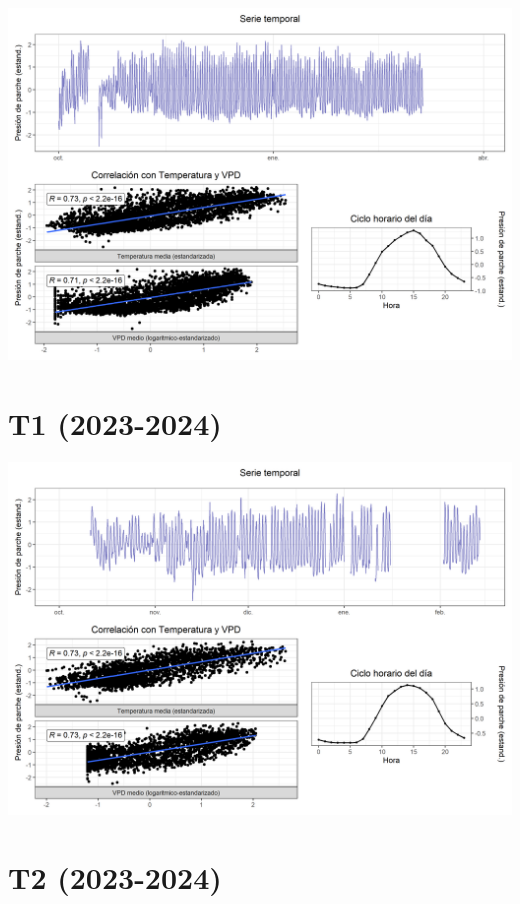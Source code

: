 \documentclass[
  letterpaper,
  DIV=11,
  numbers=noendperiod]{scrreprt}
\begin{document}
\includegraphics{figuras/05_turgor_tratamiento/2022_2023_La_Esperanza_T4.png}

\chapter{T1 (2023-2024)}

\includegraphics{figuras/05_turgor_tratamiento/2023_2024_La_Esperanza_T1.png}

\chapter{T2 (2023-2024)}
\end{document}

